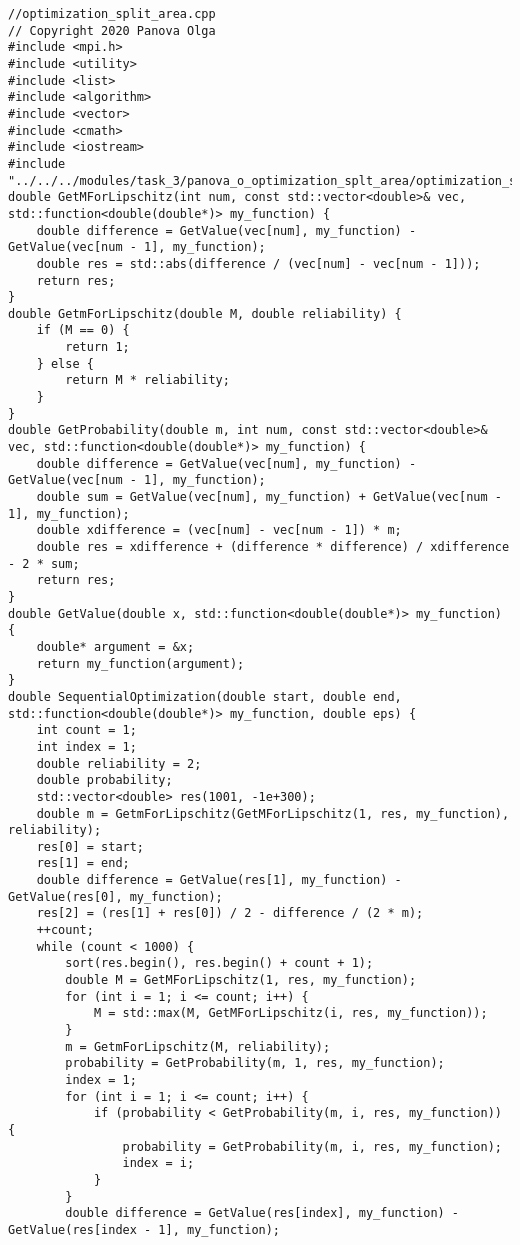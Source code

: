 \documentclass{report}
\begin{document}
\begin{lstlisting}
//optimization_split_area.cpp
// Copyright 2020 Panova Olga
#include <mpi.h>
#include <utility>
#include <list>
#include <algorithm>
#include <vector>
#include <cmath>
#include <iostream>
#include "../../../modules/task_3/panova_o_optimization_splt_area/optimization_split_area.h"
double GetMForLipschitz(int num, const std::vector<double>& vec, std::function<double(double*)> my_function) {
    double difference = GetValue(vec[num], my_function) - GetValue(vec[num - 1], my_function);
    double res = std::abs(difference / (vec[num] - vec[num - 1]));
    return res;
}
double GetmForLipschitz(double M, double reliability) {
    if (M == 0) {
        return 1;
    } else {
        return M * reliability;
    }
}
double GetProbability(double m, int num, const std::vector<double>& vec, std::function<double(double*)> my_function) {
    double difference = GetValue(vec[num], my_function) - GetValue(vec[num - 1], my_function);
    double sum = GetValue(vec[num], my_function) + GetValue(vec[num - 1], my_function);
    double xdifference = (vec[num] - vec[num - 1]) * m;
    double res = xdifference + (difference * difference) / xdifference - 2 * sum;
    return res;
}
double GetValue(double x, std::function<double(double*)> my_function) {
    double* argument = &x;
    return my_function(argument);
}
double SequentialOptimization(double start, double end, std::function<double(double*)> my_function, double eps) {
    int count = 1;
    int index = 1;
    double reliability = 2;
    double probability;
    std::vector<double> res(1001, -1e+300);
    double m = GetmForLipschitz(GetMForLipschitz(1, res, my_function), reliability);
    res[0] = start;
    res[1] = end;
    double difference = GetValue(res[1], my_function) - GetValue(res[0], my_function);
    res[2] = (res[1] + res[0]) / 2 - difference / (2 * m);
    ++count;
    while (count < 1000) {
        sort(res.begin(), res.begin() + count + 1);
        double M = GetMForLipschitz(1, res, my_function);
        for (int i = 1; i <= count; i++) {
            M = std::max(M, GetMForLipschitz(i, res, my_function));
        }
        m = GetmForLipschitz(M, reliability);
        probability = GetProbability(m, 1, res, my_function);
        index = 1;
        for (int i = 1; i <= count; i++) {
            if (probability < GetProbability(m, i, res, my_function)) {
                probability = GetProbability(m, i, res, my_function);
                index = i;
            }
        }
        double difference = GetValue(res[index], my_function) - GetValue(res[index - 1], my_function);

\end{lstlisting}
\end{document}
